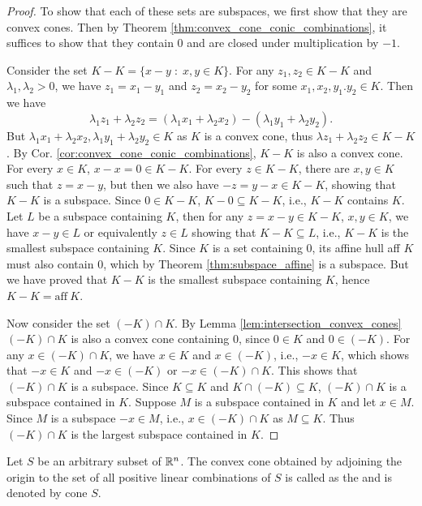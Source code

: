 \documentclass[11pt,a4paper]{article}
\begin{document}
\begin{proof}
    To show that each of these sets are subspaces, we first show that they are convex cones. Then by Theorem \ref{thm:convex_cone_conic_combinations}, it suffices to show that they contain $0$ and are closed under multiplication by $-1$. 
    
    Consider the set $K-K = \{x-y\;:\; x,y\in K\}$. For any $z_1,z_2\in K-K$ and $\lambda_1,\lambda_2>0$, we have $z_1 = x_1-y_1$ and $z_2 = x_2-y_2$ for some $x_1,x_2,y_1.y_2\in K$. Then we have
    \begin{equation*}
        \lambda_1 z_1+\lambda_2 z_2 = (\lambda_1 x_1 + \lambda_2 x_2) - (\lambda_1 y_1 + \lambda_2 y_2).
    \end{equation*}
    But $\lambda_1 x_1 + \lambda_2 x_2, \lambda_1 y_1 + \lambda_2 y_2\in K$ as $K$ is a convex cone, thus $\lambda z_1 +\lambda_2 z_2\in K-K$. By Cor. \ref{cor:convex_cone_conic_combinations}, $K-K$ is also a convex cone. For every $x\in K$, $x-x = 0 \in K-K$. For every $z\in K-K$, there are $x,y\in K$ such that $z = x-y$, but then we also have $-z = y-x\in K-K$, showing that $K-K$ is a subspace. Since $0\in K-K$, $K-0\subseteq K-K$, i.e., $K-K$ contains $K$. Let $L$ be a subspace containing $K$, then for any $z = x-y\in K-K$, $x,y\in K$, we have $x-y\in L$ or equivalently $z\in L$ showing that $K-K\subseteq L$, i.e., $K-K$ is the smallest subspace containing $K$. Since $K$ is a set containing $0$, its affine hull aff $K$ must also contain $0$, which by Theorem \ref{thm:subspace_affine} is a subspace. But we have proved that $K-K$ is the smallest subspace containing $K$, hence $K-K = \text{aff}\ K$.

    Now consider the set $(-K)\cap K$. By Lemma \ref{lem:intersection_convex_cones} $(-K)\cap K$ is also a convex cone containing $0$, since $0\in K$ and $0\in (-K)$. For any $x\in (-K)\cap K$, we have $x\in K$ and $x\in (-K)$, i.e., $-x\in K$, which shows that $-x\in K$ and $-x\in (-K)$ or $-x\in (-K)\cap K$. This shows that $(-K)\cap K$ is a subspace. Since $K\subseteq K$ and $K\cap (-K)\subseteq K$, $(-K)\cap K$ is a subspace contained in $K$. Suppose $M$ is a subspace contained in $K$ and let $x\in M$. Since $M$ is a subspace $-x\in M$, i.e., $x\in (-K)\cap K$ as $M\subseteq K$. Thus $(-K)\cap K$ is the largest subspace contained in $K$.  
\end{proof}

\begin{definition}\label{def:convex_cone_generated_by_a_set}
    Let $S$ be an arbitrary subset of $\mathbb{R}^n$. The convex cone obtained by adjoining the origin to the set of all positive linear combinations of $S$ is called as the   and is denoted by cone $S$.
\end{definition}
\end{document}
